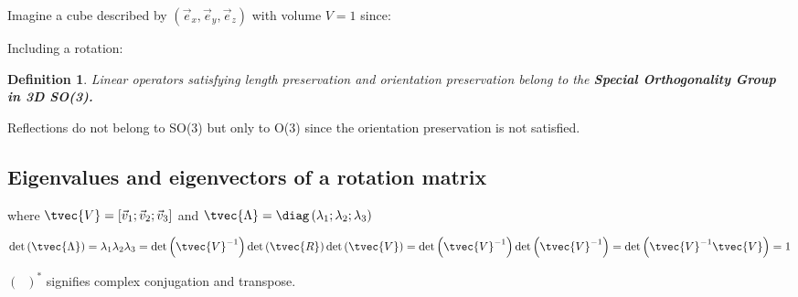 \documentclass[10pt,a4paper]{scrartcl}
\newtheorem{define}{Definition}
\begin{document}
\begin{multicols*}{2}

Imagine a cube described by $\left(\vec{e}_x,\vec{e}_y,\vec{e}_z\right)$ with volume $V=1$ since:


Including a rotation:



\begin{define}
Linear operators satisfying length preservation and orientation preservation belong to the \textbf{Special Orthogonality Group in 3D SO(3).}
\end{define}

Reflections do not belong to SO(3) but only to O(3) since the orientation preservation is not satisfied.

\subsection{Eigenvalues and eigenvectors of a rotation matrix}


where $\tvec{V}=\left[\vec{v}_1;\vec{v}_2;\vec{v}_3\right]$ and $\tvec{\Lambda}=\diag\left(\lambda_1;\lambda_2;\lambda_3\right)$


\begin{align*}
\det\left(\tvec{\Lambda}\right)=\lambda_1\lambda_2\lambda_3=\det\left(\tvec{V}^{-1}\right)\det\left(\tvec{R}\right)\det\left(\tvec{V}\right)=\det\left(\tvec{V}^{-1}\right)\det\left(\tvec{V}^{-1}\right)=\det\left(\tvec{V}^{-1}\tvec{V}\right)=1
\end{align*}


$(\phantom{x})^\ast$ signifies complex conjugation and transpose.



\end{multicols*}
\end{document}

